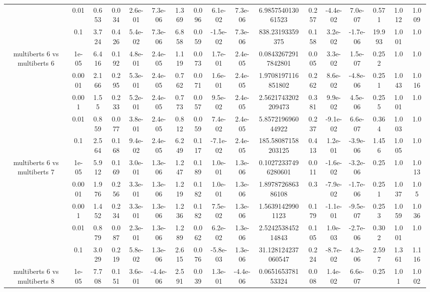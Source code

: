 \begin{tabular}{|c|c|c|c|c|c|c|c|c|c|c|c|c|c|c|c|c|}
 & 0.01 & 0.653 & 0.034 & 2.6e-01 & 7.3e-06 & 1.369 & 0.096 & 6.1e-02 & 7.3e-06 & 6.985754013061523 & 0.257 & -4.4e-02 & 7.0e-07 & 0.571 & 1.012 & 1.009 \\
 & 0.1 & 3.724 & 0.426 & 5.4e-02 & 7.3e-06 & 6.858 & 0.059 & -1.5e-02 & 7.3e-06 & 838.23193359375 & 0.158 & 3.2e-02 & -1.7e-06 & 19.993 & 1.001 & 1.0 \\
\hline
\multirow{5}{*}{multiberts 6 vs multiberts 6} & 1e-05 & 6.416 & 0.192 & 4.8e-01 & 2.4e-05 & 1.119 & 0.073 & 1.7e-01 & 2.4e-05 & 0.08432672917842801 & 0.005 & 3.3e-02 & 1.5e-07 & 0.252 & 1.0 & 1.0 \\
 & 0.0001 & 2.166 & 0.295 & 5.3e-01 & 2.4e-05 & 0.762 & 0.071 & 1.6e-01 & 2.4e-05 & 1.9708197116851802 & 0.262 & 8.6e-02 & -4.8e-06 & 0.251 & 1.043 & 1.016 \\
 & 0.001 & 1.55 & 0.233 & 5.2e-01 & 2.4e-05 & 0.773 & 0.057 & 9.5e-02 & 2.4e-05 & 2.5621743202209473 & 0.381 & 9.9e-02 & 4.5e-06 & 0.255 & 1.001 & 1.0 \\
 & 0.01 & 0.859 & 0.077 & 3.8e-01 & 2.4e-05 & 0.812 & 0.059 & 7.4e-02 & 2.4e-05 & 5.857219696044922 & 0.237 & -9.1e-02 & 6.6e-07 & 0.364 & 1.003 & 1.0 \\
 & 0.1 & 2.564 & 0.168 & 9.4e-02 & 2.4e-05 & 6.249 & 0.117 & -7.1e-02 & 2.4e-05 & 185.58087158203125 & 0.413 & 1.2e-01 & -3.9e-06 & 1.456 & 1.005 & 1.0 \\
\hline
\multirow{5}{*}{multiberts 6 vs multiberts 7} & 1e-05 & 5.912 & 0.169 & 3.0e-01 & 1.3e-06 & 1.247 & 0.189 & 1.0e-01 & 1.3e-06 & 0.10272337496280601 & 0.011 & -1.6e-02 & -3.2e-06 & 0.25 & 1.0 & 1.013 \\
 & 0.0001 & 1.976 & 0.256 & 3.3e-01 & 1.3e-06 & 1.219 & 0.182 & 1.0e-01 & 1.3e-06 & 1.897872686386108 & 0.3 & -7.9e-02 & -1.7e-06 & 0.251 & 1.037 & 1.05 \\
 & 0.001 & 1.452 & 0.234 & 3.3e-01 & 1.3e-06 & 1.236 & 0.182 & 7.5e-02 & 1.3e-06 & 1.56391429901123 & 0.179 & -1.1e-01 & -9.5e-07 & 0.253 & 1.059 & 1.036 \\
 & 0.01 & 0.879 & 0.087 & 2.3e-01 & 1.3e-06 & 1.289 & 0.062 & 6.2e-02 & 1.3e-06 & 2.524253845214843 & 0.105 & 1.0e-03 & -2.7e-06 & 0.302 & 1.001 & 1.0 \\
 & 0.1 & 3.029 & 0.219 & 5.8e-02 & 1.3e-06 & 2.615 & 0.076 & -5.8e-03 & 1.3e-06 & 31.128124237060547 & 0.224 & -8.7e-02 & 4.2e-06 & 2.597 & 1.361 & 1.116 \\
\hline
\multirow{5}{*}{multiberts 6 vs multiberts 8} & 1e-05 & 7.708 & 0.151 & 3.6e-01 & -4.4e-06 & 2.591 & 0.039 & 1.3e-01 & -4.4e-06 & 0.065165378153324 & 0.008 & 1.4e-02 & 6.6e-07 & 0.25 & 1.01 & 1.002 \\

\end{tabular}
